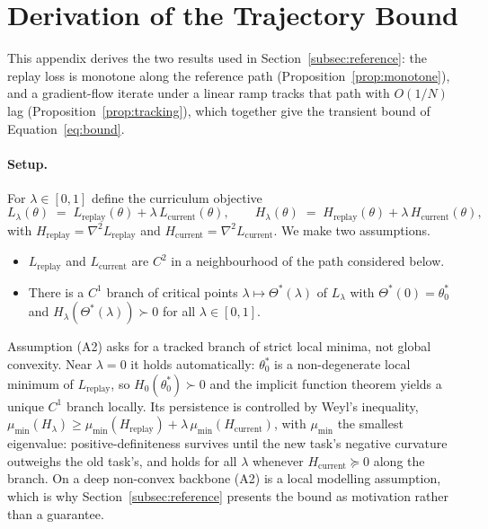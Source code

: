 \section{Derivation of the Trajectory Bound}
\label{app:detailed_proof}

This appendix derives the two results used in Section~\ref{subsec:reference}: the replay loss is monotone along the reference path (Proposition~\ref{prop:monotone}), and a gradient-flow iterate under a linear ramp tracks that path with $O(1/N)$ lag (Proposition~\ref{prop:tracking}), which together give the transient bound of Equation~\eqref{eq:bound}.

\paragraph{Setup.} For $\lambda \in [0,1]$ define the curriculum objective
\begin{equation}
    L_\lambda(\theta) \;=\; L_{\text{replay}}(\theta) + \lambda\, L_{\text{current}}(\theta),
    \qquad
    H_\lambda(\theta) \;=\; H_{\text{replay}}(\theta) + \lambda\, H_{\text{current}}(\theta),
\end{equation}
with $H_{\text{replay}} = \nabla^2 L_{\text{replay}}$ and $H_{\text{current}} = \nabla^2 L_{\text{current}}$. We make two assumptions.

\begin{itemize}
    \item[\textbf{(A1)}] $L_{\text{replay}}$ and $L_{\text{current}}$ are $C^2$ in a neighbourhood of the path considered below.
    \item[\textbf{(A2)}] There is a $C^1$ branch of critical points $\lambda \mapsto \Theta^*(\lambda)$ of $L_\lambda$ with $\Theta^*(0) = \theta_0^*$ and $H_\lambda(\Theta^*(\lambda)) \succ 0$ for all $\lambda \in [0,1]$.
\end{itemize}

Assumption (A2) asks for a tracked branch of strict local minima, not global convexity. Near $\lambda = 0$ it holds automatically: $\theta_0^*$ is a non-degenerate local minimum of $L_{\text{replay}}$, so $H_0(\theta_0^*) \succ 0$ and the implicit function theorem yields a unique $C^1$ branch locally. Its persistence is controlled by Weyl's inequality, $\mu_{\min}(H_\lambda) \ge \mu_{\min}(H_{\text{replay}}) + \lambda\, \mu_{\min}(H_{\text{current}})$, with $\mu_{\min}$ the smallest eigenvalue: positive-definiteness survives until the new task's negative curvature outweighs the old task's, and holds for all $\lambda$ whenever $H_{\text{current}} \succeq 0$ along the branch. On a deep non-convex backbone (A2) is a local modelling assumption, which is why Section~\ref{subsec:reference} presents the bound as motivation rather than a guarantee.

